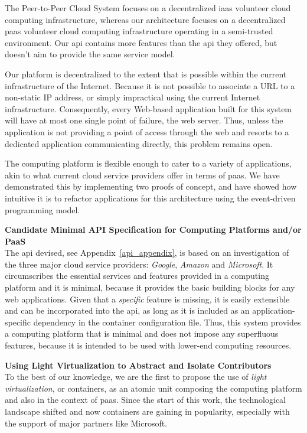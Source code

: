 \documentclass[12pt, titlepage]{uo_temp}
\begin{document}
     The Peer-to-Peer Cloud System focuses on a decentralized \gls{iaas} volunteer cloud
     computing infrastructure, whereas our architecture focuses on a decentralized
     \gls{paas} volunteer cloud computing infrastructure operating in a semi-trusted
     environment. Our \gls{api} contains more features than the \gls{api} they offered,
     but doesn't aim to provide the same service model.

     Our platform is decentralized to the extent that is possible within the current
     infrastructure of the Internet. Because it is not possible to associate a URL to a
     non-static IP address, or simply impractical using the current Internet
     infrastructure. Consequently, every Web-based application built for this system will
     have at most one single point of failure, the web server. Thus, unless the
     application is not providing a point of access through the web and resorts to a
     dedicated application communicating directly, this problem remains open.

     The computing platform is flexible enough to cater to a variety of applications, akin
     to what current cloud service providers offer in terms of \gls{paas}. We have
     demonstrated this by implementing two proofs of concept, and have showed how intuitive it
     is to refactor applications for this architecture using the
     event-driven programming model.

     \textbf{Candidate Minimal API Specification for Computing Platforms and/or PaaS}\\
     The \gls{api} devised, see Appendix~\ref{api_appendix}, is based on an investigation of the three major cloud service
     providers: \emph{Google}, \emph{Amazon} and \emph{Microsoft}. It circumscribes the
     essential services and features provided in a computing platform and it is minimal,
     because it provides the basic building blocks for any web applications. Given that a
     \emph{specific} feature is missing, it is easily extensible and can be incorporated into
     the \gls{api}, as long as it is included as an application-specific dependency in the
     container configuration file. Thus, this system provides a computing platform that is
     minimal and does not impose any superfluous features, because it is intended to be
     used with lower-end computing resources. 

     \textbf{Using Light Virtualization to Abstract and Isolate Contributors}\\
     To the best of our knowledge, we are the first to propose the use of \emph{light
       virtualization}, or containers, as an atomic unit composing the computing
     platform and also in the context of \gls{paas}. Since the start of this work,
     the technological landscape shifted and now containers are gaining in popularity,
     especially with the support of major partners like Microsoft.
\end{document}
